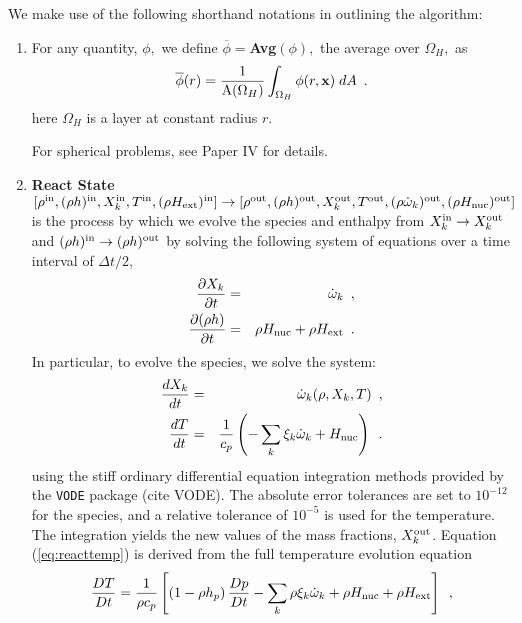 We make use of the following shorthand notations in outlining the algorithm:
\begin{enumerate}

\item For any quantity, $\phi,$ we define $\overline{\phi} = ${\bf Avg}$(\phi),$ 
the average over $\Omega_H,$ as
\begin{equation}
\overline{\phi}(r) 
= \frac{1}{\mathrm{A}(\Omega_H)}\int_{\Omega_H} \phi(r,{\bf x}) \; dA \enskip .
\end{equation}
here $\Omega_H$ is a layer at constant radius $r$.

For spherical problems, see Paper IV for details.

\item {\bf React State}$[\rho^{\mathrm{in}},(\rho h)^{\mathrm{in}},X_k^{\mathrm{in}},T^{\mathrm{in}}, (\rho{H_{\rm ext}})^{\mathrm{in}}]\rightarrow [\rho^{\mathrm{out}}, (\rho h)^{\mathrm{out}}, X_k^{\mathrm{out}}, T^{\mathrm{out}}, (\rho \dot{\omega}_k)^{\mathrm{out}}, (\rho{H_{\rm nuc}})^{\mathrm{out}}]$ \\
is the process by which we evolve the species and enthalpy from 
$X_k^{\mathrm{in}} \rightarrow X_k^{\mathrm{out}}$ 
and $(\rho h)^{\mathrm{in}} \rightarrow (\rho h)^{\mathrm{out}}$ by solving the following 
system of equations over a time interval of  $\Delta t/2$,
\begin{eqnarray}
\frac{\partial X_k}{\partial t} &=& \dot{\omega}_k\enskip,\\
\frac{\partial (\rho h)}{\partial t} &=& \rho {H_{\rm nuc}} + \rho {H_{\rm ext}}\enskip .
\end{eqnarray}
  In particular, to evolve the species, we solve the system:
\begin{eqnarray}
\frac{dX_k}{dt} &=& \dot{\omega}_k(\rho,X_k,T)\enskip, \\
\frac{dT}{dt} &=&\frac{1}{c_p} \left ( -\sum_k \xi_k  \dot{\omega}_k  + {H_{\rm nuc}} \right )
\enskip. \label{eq:reacttemp}
\end{eqnarray}
using the stiff ordinary differential equation integration methods
provided by the {\tt VODE} package (cite VODE).  The absolute error
tolerances are set to $10^{-12}$ for the species, and a relative
tolerance of $10^{-5}$ is used for the temperature.  The integration
yields the new values of the mass fractions, $X_k^{\mathrm{out}}$.  Equation
(\ref{eq:reacttemp}) is derived from the full temperature evolution equation
\begin{equation}
\label{eq:tempenthalpy}
\frac{DT}{Dt} = \frac{1}{\rho c_p} \left[ \left(1 - \rho h_p\right) \frac{D p}{D t}
 - \sum_k \rho \xi_k {\dot{\omega}}_k 
 + \rho {H_{\rm nuc}} + \rho {H_{\rm ext}} \right] \enskip , 
\end{equation}

\end{enumerate}
